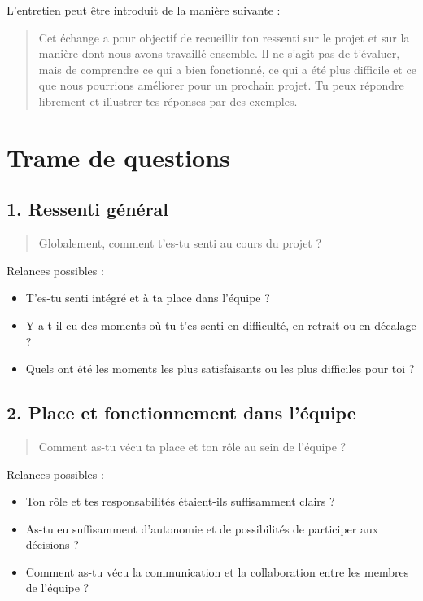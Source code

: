 L'entretien peut être introduit de la manière suivante :

\begin{quote}
Cet échange a pour objectif de recueillir ton ressenti sur le projet et sur la manière dont nous avons travaillé ensemble. Il ne s'agit pas de t'évaluer, mais de comprendre ce qui a bien fonctionné, ce qui a été plus difficile et ce que nous pourrions améliorer pour un prochain projet. Tu peux répondre librement et illustrer tes réponses par des exemples.
\end{quote}

\section{Trame de questions}

\subsection*{1. Ressenti général}

\begin{quote}
Globalement, comment t'es-tu senti au cours du projet ?
\end{quote}

Relances possibles :

\begin{itemize}
    \item T'es-tu senti intégré et à ta place dans l'équipe ?
    \item Y a-t-il eu des moments où tu t'es senti en difficulté, en retrait ou en décalage ?
    \item Quels ont été les moments les plus satisfaisants ou les plus difficiles pour toi ?
\end{itemize}

\subsection*{2. Place et fonctionnement dans l'équipe}

\begin{quote}
Comment as-tu vécu ta place et ton rôle au sein de l'équipe ?
\end{quote}

Relances possibles :

\begin{itemize}
    \item Ton rôle et tes responsabilités étaient-ils suffisamment clairs ?
    \item As-tu eu suffisamment d'autonomie et de possibilités de participer aux décisions ?
    \item Comment as-tu vécu la communication et la collaboration entre les membres de l'équipe ?
\end{itemize}

